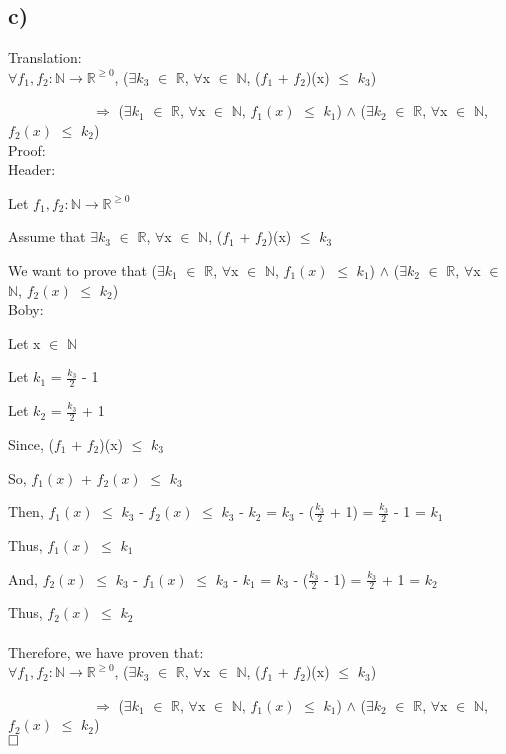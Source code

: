 \documentclass[12pt]{article}
\begin{document}
\subsection*{c)}
\vspace{20pt}
Translation:\\
\(\forall f_1, f_2 : \mathbb{N} \to \mathbb{R}^{\geq 0}\), ($\exists$$k_3$ $\in$ $\mathbb{R}$, $\forall$x $\in$ $\mathbb{N}$, ($f_1$ + $f_2$)(x) $\leq$ $k_3$) 

$\quad$ $\qquad$ $\qquad$ $\Rightarrow$  ($\exists$$k_1$ $\in$ $\mathbb{R}$, $\forall$x $\in$ $\mathbb{N}$, $f_1(x)$ $\leq$ $k_1$) $\wedge$ ($\exists$$k_2$ $\in$ $\mathbb{R}$, $\forall$x $\in$ $\mathbb{N}$, $f_2(x)$ $\leq$ $k_2$) \\
Proof:\\
Header:

Let \(f_1, f_2 : \mathbb{N} \to \mathbb{R}^{\geq 0}\) 

Assume that $\exists$$k_3$ $\in$ $\mathbb{R}$, $\forall$x $\in$ $\mathbb{N}$, ($f_1$ + $f_2$)(x) $\leq$ $k_3$

We want to prove that ($\exists$$k_1$ $\in$ $\mathbb{R}$, $\forall$x $\in$ $\mathbb{N}$, $f_1(x)$ $\leq$ $k_1$) $\wedge$ ($\exists$$k_2$ $\in$ $\mathbb{R}$, $\forall$x $\in$ $\mathbb{N}$, $f_2(x)$ $\leq$ $k_2$) \\
Boby:

Let x $\in$ $\mathbb{N}$

Let $k_1$ = $\frac{k_3}{2}$ - 1

Let $k_2$ = $\frac{k_3}{2}$ + 1

Since, ($f_1$ + $f_2$)(x) $\leq$ $k_3$

So, $f_1(x)$ + $f_2(x)$ $\leq$ $k_3$

Then, $f_1(x)$ $\leq$ $k_3$ - $f_2(x)$ $\leq$ $k_3$ - $k_2$ = $k_3$ - ($\frac{k_3}{2}$ + 1) = $\frac{k_3}{2}$ - 1 = $k_1$

Thus, $f_1(x)$ $\leq$ $k_1$

And, $f_2(x)$ $\leq$ $k_3$ - $f_1(x)$ $\leq$ $k_3$ - $k_1$ = $k_3$ - ($\frac{k_3}{2}$ - 1) = $\frac{k_3}{2}$ + 1 = $k_2$

Thus, $f_2(x)$ $\leq$ $k_2$\\
~\\
Therefore, we have proven that:\\
\(\forall f_1, f_2 : \mathbb{N} \to \mathbb{R}^{\geq 0}\), ($\exists$$k_3$ $\in$ $\mathbb{R}$, $\forall$x $\in$ $\mathbb{N}$, ($f_1$ + $f_2$)(x) $\leq$ $k_3$) 

$\quad$ $\qquad$ $\qquad$ $\Rightarrow$  ($\exists$$k_1$ $\in$ $\mathbb{R}$, $\forall$x $\in$ $\mathbb{N}$, $f_1(x)$ $\leq$ $k_1$) $\wedge$ ($\exists$$k_2$ $\in$ $\mathbb{R}$, $\forall$x $\in$ $\mathbb{N}$, $f_2(x)$ $\leq$ $k_2$) \\

$\hfill\square$






\vspace{20pt}
\end{document}
